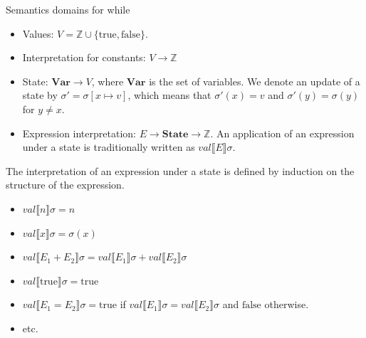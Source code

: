 \documentclass{beamer}
\begin{document}
    \begin{frame}{Semantics domains for while}
      \begin{itemize}
        \item Values: $V=\mathbb{Z}\cup\{\text{true},\text{false}\}$.
        \item Interpretation for constants: $V\to\mathbb{Z}$
        \item State: $\textbf{Var}\to V$, where $\textbf{Var}$ is the set of variables. We denote an update of a state by $\sigma'=\sigma[x\mapsto v]$, which means that $\sigma'(x)=v$ and $\sigma'(y)=\sigma(y)$ for $y\neq x$.
        \item Expression interpretation: $E\to\textbf{State}\to\mathbb{Z}$. An application of an expression under a state is traditionally written as $val\llbracket E\rrbracket\sigma$.
      \end{itemize}
      The interpretation of an expression under a state is defined by induction on the structure of the expression.
      \begin{itemize}
        \item $val\llbracket n\rrbracket\sigma=n$
        \item $val\llbracket x\rrbracket\sigma=\sigma(x)$
        \item $val\llbracket E_1+E_2\rrbracket\sigma=val\llbracket E_1\rrbracket\sigma+val\llbracket E_2\rrbracket\sigma$
        \item $val\llbracket\text{true}\rrbracket\sigma=\text{true}$
        \item $val\llbracket E_1=E_2\rrbracket\sigma=\text{true}$ if $val\llbracket E_1\rrbracket\sigma=val\llbracket E_2\rrbracket\sigma$ and $\text{false}$ otherwise.
        \item etc.
      \end{itemize}
    \end{frame}
\end{document}

